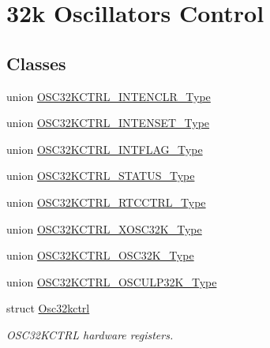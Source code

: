 \hypertarget{group___s_a_m_l21___o_s_c32_k_c_t_r_l}{}\section{32k Oscillators Control}
\label{group___s_a_m_l21___o_s_c32_k_c_t_r_l}
\subsection*{Classes}
\begin{DoxyCompactItemize}
\item 
union \hyperlink{union_o_s_c32_k_c_t_r_l___i_n_t_e_n_c_l_r___type}{O\+S\+C32\+K\+C\+T\+R\+L\+\_\+\+I\+N\+T\+E\+N\+C\+L\+R\+\_\+\+Type}
\item 
union \hyperlink{union_o_s_c32_k_c_t_r_l___i_n_t_e_n_s_e_t___type}{O\+S\+C32\+K\+C\+T\+R\+L\+\_\+\+I\+N\+T\+E\+N\+S\+E\+T\+\_\+\+Type}
\item 
union \hyperlink{union_o_s_c32_k_c_t_r_l___i_n_t_f_l_a_g___type}{O\+S\+C32\+K\+C\+T\+R\+L\+\_\+\+I\+N\+T\+F\+L\+A\+G\+\_\+\+Type}
\item 
union \hyperlink{union_o_s_c32_k_c_t_r_l___s_t_a_t_u_s___type}{O\+S\+C32\+K\+C\+T\+R\+L\+\_\+\+S\+T\+A\+T\+U\+S\+\_\+\+Type}
\item 
union \hyperlink{union_o_s_c32_k_c_t_r_l___r_t_c_c_t_r_l___type}{O\+S\+C32\+K\+C\+T\+R\+L\+\_\+\+R\+T\+C\+C\+T\+R\+L\+\_\+\+Type}
\item 
union \hyperlink{union_o_s_c32_k_c_t_r_l___x_o_s_c32_k___type}{O\+S\+C32\+K\+C\+T\+R\+L\+\_\+\+X\+O\+S\+C32\+K\+\_\+\+Type}
\item 
union \hyperlink{union_o_s_c32_k_c_t_r_l___o_s_c32_k___type}{O\+S\+C32\+K\+C\+T\+R\+L\+\_\+\+O\+S\+C32\+K\+\_\+\+Type}
\item 
union \hyperlink{union_o_s_c32_k_c_t_r_l___o_s_c_u_l_p32_k___type}{O\+S\+C32\+K\+C\+T\+R\+L\+\_\+\+O\+S\+C\+U\+L\+P32\+K\+\_\+\+Type}
\item 
struct \hyperlink{struct_osc32kctrl}{Osc32kctrl}
\begin{DoxyCompactList}\small\item\em O\+S\+C32\+K\+C\+T\+R\+L hardware registers. \end{DoxyCompactList}\end{DoxyCompactItemize}
